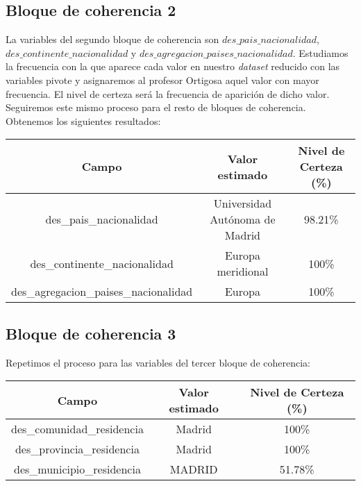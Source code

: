 \documentclass[a4paper]{article}
\begin{document}
\subsection{Bloque de coherencia 2}

La variables del segundo bloque de coherencia son $des\_pais\_nacionalidad$, $des\_continente\_nacionalidad$ y $des\_agregacion\_paises\_nacionalidad$. Estudiamos la frecuencia con la que aparece cada valor en nuestro \emph{dataset} reducido con las variables pivote y asignaremos al profesor Ortigosa aquel valor con mayor frecuencia. El nivel de certeza será la frecuencia de aparición de dicho valor. Seguiremos este mismo proceso para el resto de bloques de coherencia. Obtenemos los siguientes resultados:

\begin{table}[H]
	\centering
	\begin{tabular}{ccc}
		\textbf{Campo}                        & \textbf{Valor estimado}        & \textbf{Nivel de Certeza (\%)} \\ \hline
		des\_pais\_nacionalidad               & Universidad Autónoma de Madrid & 98.21\%                        \\
		des\_continente\_nacionalidad         & Europa meridional              & 100\%                          \\
		des\_agregacion\_paises\_nacionalidad & Europa                         & 100\%                         
	\end{tabular}
\end{table}

\subsection{Bloque de coherencia 3}

Repetimos el proceso para las variables del tercer bloque de coherencia:

\begin{table}[H]
	\centering
	\begin{tabular}{ccc}
		\textbf{Campo}             & \textbf{Valor estimado} & \textbf{Nivel de Certeza (\%)} \\ \hline
		des\_comunidad\_residencia & Madrid                  & 100\%                          \\
		des\_provincia\_residencia & Madrid                  & 100\%                          \\
		des\_municipio\_residencia & MADRID                  & 51.78\%                       
	\end{tabular}
\end{table}
\end{document}
